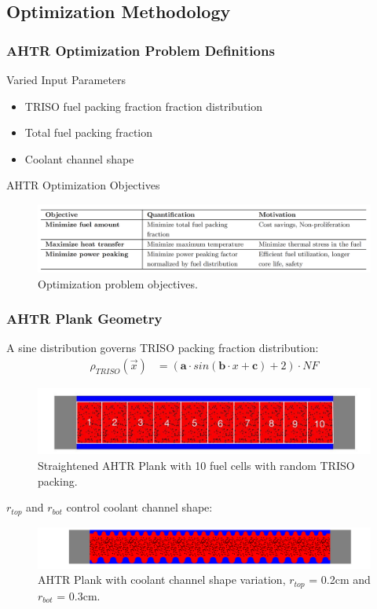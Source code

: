 \subsection{Optimization Methodology}
\begin{frame}
    \frametitle{AHTR Optimization Problem Definitions}
    \begin{block}{Varied Input Parameters}
        \begin{itemize}
            \item TRISO fuel packing fraction fraction distribution 
            \item Total fuel packing fraction 
            \item Coolant channel shape 
        \end{itemize}
    \end{block}
    \begin{block}{AHTR Optimization Objectives}
        \begin{figure}
            \includegraphics[width=0.9\linewidth]{figures/ahtr-opt-obj.png} 
            \caption{Optimization problem objectives.}
        \end{figure}
    \end{block}
\end{frame}

\begin{frame}
    \frametitle{AHTR Plank Geometry}
    A sine distribution governs TRISO packing fraction distribution: 
    \begin{align}
        \rho_{TRISO}(\vec{x}) &= \left(\textbf{a}\cdot sin(\textbf{b}\cdot x + \textbf{c}) + 2\right) \cdot NF \nonumber
    \end{align}
    \begin{figure}
        \includegraphics[width=0.9\linewidth]{../docs/figures/straightened_plank.png} 
        \caption{Straightened AHTR Plank with 10 fuel cells with random TRISO packing.}
    \end{figure}
    $r_{top}$ and $r_{bot}$ control coolant channel shape: 
    \begin{figure}
        \includegraphics[width=\linewidth]{../docs/figures/coolant-channel-shape.png} 
        \caption{AHTR Plank with coolant channel shape variation, $r_{top}$ = 0.2cm and 
        $r_{bot}$ = 0.3cm.}
    \end{figure}
\end{frame}

